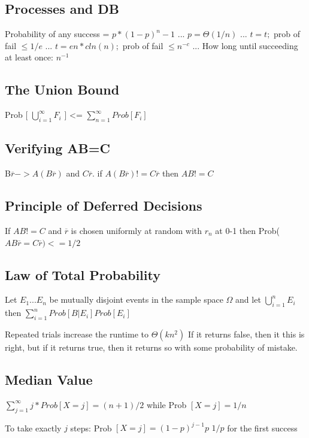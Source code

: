
\subsection{Processes and DB}

Probability of any success =  $p* (1 - p) ^ n-1 $ ...
$p = \Theta(1/n)$ ...
$t = t;$ prob of fail $\leq 1/e$ ...
$t = en*cln(n);$ prob of fail $\leq n^{-c}$ ...
How long until succeeding at least once: $n^{-1}$

\subsection{The Union Bound}
Prob [ $\bigcup\limits_{i=1}^{\infty} F_{i}$ ] <= $\sum_{n=1}^{\infty}  Prob[ F_{i}] $ 


\subsection{Verifying AB=C}

B$\overbar{r} -> A(B\overbar{r})$ and $C\overbar{r}$. if $A(B\overbar{r}) != C\overbar{r}$ then $AB != C$

\subsection{Principle of Deferred Decisions}
If $AB != C$ and $\overbar{r}$ is chosen uniformly at random with $r_n$ at 0-1 then Prob($AB\overbar{r} = C\overbar{r}) <= 1/2$

\subsection{Law of Total Probability}
Let $E_1 ... E_n$ be mutually disjoint events in the sample space $\Omega$ and let $\bigcup\limits_{i=1}^{n} E_{i}$ then $\sum_{i=1}^{n}  Prob[ B | E_{i}] Prob[E_{i}] $ 

Repeated trials increase the runtime to $\Theta(kn^2)$
If it returns false, then it this is right, but if it returns true, then it returns so with some probability of mistake.


\subsection{Median Value}
$\sum_{j=1}^{\infty}  j * Prob[ X = j ]  = (n + 1) / 2$ while Prob $[X = j] = 1/n$

To take exactly $j$ steps: Prob $[X = j] = (1 - p)^{j - 1} p$
$1/p$ for the first success

